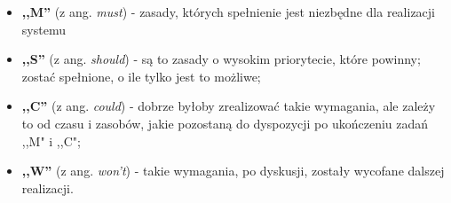 \begin{itemize}
	\item \textbf{,,M''} (z ang. \textit{must}) - zasady, których spełnienie jest niezbędne dla realizacji systemu
	\item \textbf{,,S''} (z ang. \textit{should}) - są to zasady o wysokim priorytecie, które powinny;
	zostać spełnione, o ile tylko jest to możliwe;
	\item \textbf{,,C''} (z ang. \textit{could}) - dobrze byłoby zrealizować takie wymagania, ale zależy to od czasu
	i zasobów, jakie pozostaną do dyspozycji po ukończeniu zadań ,,M" i ,,C";
	\item \textbf{,,W''} (z ang. \textit{won't}) - takie wymagania, po dyskusji, zostały wycofane dalszej realizacji.
\end{itemize}

